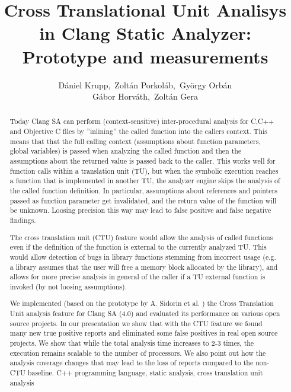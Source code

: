 \documentclass{article}
\title{Cross Translational Unit Analisys in Clang Static Analyzer: Prototype and measurements}
\author{D\'aniel Krupp\inst1,\ Zolt\'an Porkol\'ab\inst1,\ Gy\"orgy Orb\'an\inst1\\
        G\'abor Horv\'ath\inst2,\ Zolt\'an Gera\inst2}
\institute{\inst1Ericsson Ltd., \inst2E\"{o}tv\"{o}s Lor\'{a}nd University, Faculty of Informatics\\
             \inst1\url{daniel.krupp@ericsson.com}, 
             \inst1\url{zoltan.porkolab@ericsson.com},
             \inst1\url{gyorgy.orban@ericsson.com},
             \inst2\url{xazax@caesar.elte.hu}, 
             \inst2\url{gerazo@caesar.elte.hu}}
\begin{document}
\maketitle


\begin{abstract}
Today Clang SA can perform (context-sensitive) inter-procedural analysis for 
C,C++ and Objective C files by ''inlining'' 
the called function into the callers context. This means that that the full 
calling context
(assumptions about function parameters, global variables) is passed when 
analyzing the called function and
then the assumptions about the returned value is passed back to the caller. 
This works well for function calls within a
translation unit (TU), but when the symbolic execution reaches a function that 
is implemented in another TU, the analyzer engine 
skips the analysis of the called function definition. In particular,
assumptions about references and pointers passed as function 
parameter get invalidated, and the return value of the function will be unknown.
Loosing precision this way may lead to false positive 
and false negative findings.

The cross translation unit (CTU) feature would allow the analysis of called 
functions even if the definition of the function is external to the currently 
analyzed TU. This would allow detection of bugs in library functions stemming
from incorrect usage (e.g. a library assumes that the user will free a memory 
  block allocated by the library), and allows for more precise analysis in 
general of the caller if a TU external function is invoked 
(by not loosing assumptions).

We implemented (based on the prototype by A. Sidorin et al. \cite{artemctu}) 
the Cross Translation Unit analysis feature for Clang SA (4.0) and evaluated 
its performance on various open source projects. In our presentation we show 
that with the CTU feature we found many new true positive reports and 
eliminated some false positives in real open source projects. We show that 
while the total analysis time increases to 2-3 times, the execution remains
scalable to the number of processors. We also point out how the analysis
coverage changes that may lead to the loss of reports compared to the 
non-CTU baseline.
\keywords C++ programming language, static analysis, cross translation unit analysis
\end{abstract}

\end{document}
